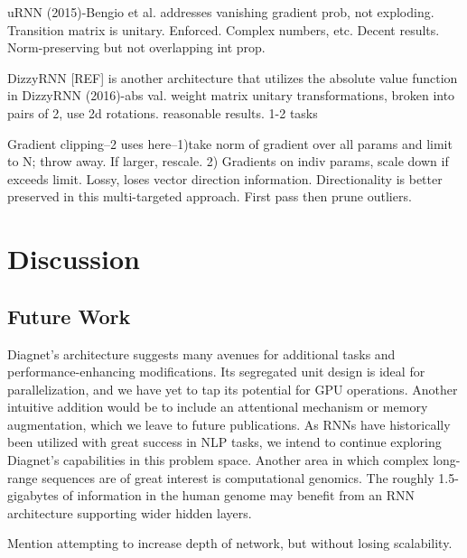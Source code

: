 \documentclass{article}
\begin{document}
uRNN (2015)-Bengio et al.  addresses vanishing gradient prob, not exploding.  Transition matrix is unitary.  Enforced.  Complex numbers, etc. Decent results. Norm-preserving but not overlapping int prop.

DizzyRNN [REF] is another architecture that utilizes the absolute value function in 
DizzyRNN (2016)-abs val. weight matrix unitary transformations, broken into pairs of 2, use 2d rotations. reasonable results. 1-2 tasks 

Gradient clipping--2 uses here--1)take norm of gradient over all params and limit to N; throw away.  If larger, rescale.  2) Gradients on indiv params, scale down if exceeds limit.  Lossy, loses vector direction information. Directionality is better preserved in this multi-targeted approach. First pass then prune outliers.   


\section{Discussion}
\subsection{Future Work}
Diagnet's architecture suggests many avenues for additional tasks and performance-enhancing modifications.  Its segregated unit design is ideal for parallelization, and we have yet to tap its potential for GPU operations.  Another intuitive addition would be to include an attentional mechanism or memory augmentation, which we leave to future publications.  
As RNNs have historically been utilized with great success in NLP tasks, we intend to continue exploring Diagnet's capabilities in this problem space.  Another area in which complex long-range sequences are of great interest is computational genomics. The roughly 1.5-gigabytes of information in the human genome may benefit from an RNN architecture supporting wider hidden layers.  

Mention attempting to increase depth of network, but without losing scalability.
\end{document}
